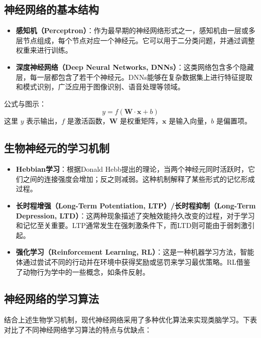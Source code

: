 \documentclass[a4paper,12pt]{article}
\begin{document}
\subsection{神经网络的基本结构}

\begin{itemize}
    \item \textbf{感知机（Perceptron）}：作为最早期的神经网络形式之一，感知机由一层或多层节点组成，每个节点对应一个神经元。它可以用于二分类问题，并通过调整权重来进行训练。
    \item \textbf{深度神经网络（Deep Neural Networks, DNNs）}：这类网络包含多个隐藏层，每一层都包含了若干个神经元。DNNs能够在复杂数据集上进行特征提取和模式识别，广泛应用于图像识别、语音处理等领域。
\end{itemize}

公式与图示：
\begin{equation}
y = f(\mathbf{W}\cdot\mathbf{x} + b)
\end{equation}
这里 $y$ 表示输出，$f$ 是激活函数，$\mathbf{W}$ 是权重矩阵，$\mathbf{x}$ 是输入向量，$b$ 是偏置项。
\subsection{生物神经元的学习机制}

\begin{itemize}
    \item \textbf{Hebbian学习}\cite{munakata2004hebbian}：根据Donald Hebb提出的理论，当两个神经元同时活跃时，它们之间的连接强度会增加；反之则减弱。这种机制解释了某些形式的记忆形成过程。
    \item \textbf{长时程增强（Long-Term Potentiation, LTP）/长时程抑制（Long-Term Depression, LTD）}\cite{lomo2018discovering}：这两种现象描述了突触效能持久改变的过程，对于学习和记忆至关重要。LTP通常发生在强刺激条件下，而LTD则可能由于弱刺激引起。
    \item \textbf{强化学习（Reinforcement Learning, RL）}\cite{kaelbling1996reinforcement}：这是一种机器学习方法，智能体通过尝试不同的行动并在环境中获得奖励或惩罚来学习最优策略。RL借鉴了动物行为学中的一些概念，如条件反射。
\end{itemize}

\subsection{神经网络的学习算法}

结合上述生物学习机制，现代神经网络采用了多种优化算法来实现类脑学习。下表对比了不同神经网络学习算法的特点与优缺点：
\end{document}

